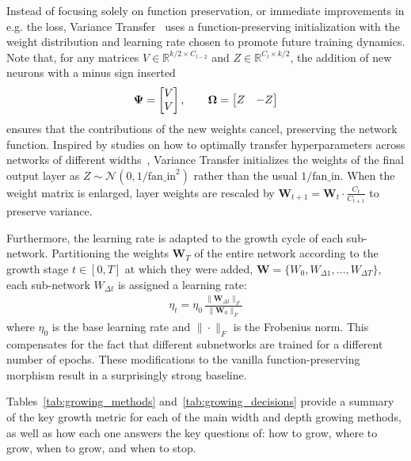 Instead of focusing solely on function preservation, or immediate improvements in e.g. the loss, Variance Transfer~\citep{yuan_accelerated_2023} uses a function-preserving initialization with the weight distribution and learning rate chosen to promote future training dynamics. Note that, for any matrices $V \in \mathbb{R}^{k/2\times C_{l-2}}$ and $Z \in \mathbb{R}^{C_l \times k/2}$, the addition of new neurons with a minus sign inserted
\begin{align}
    \boldsymbol{\Psi} = \begin{bmatrix} V \\ V \end{bmatrix}, \qquad
    \boldsymbol{\Omega} = \begin{bmatrix} Z & -Z \end{bmatrix}
\end{align}
ensures that the contributions of the new weights cancel, preserving the network function. Inspired by studies on how to optimally transfer hyperparameters across networks of different widths~\citep{yang_tensor_2021}, Variance Transfer initializes the weights of the final output layer as $Z \sim \mathcal{N}(0, 1/\textrm{fan\_in}^2)$ rather than the usual $1/\textrm{fan\_in}$. When the weight matrix is enlarged, layer weights are rescaled by $\boldsymbol{W}_{t+1}=\boldsymbol{W}_t \cdot \frac{C_t}{C_{t+1}}$ to preserve variance.

Furthermore, the learning rate is adapted to the growth cycle of each sub-network. Partitioning the weights $\mathbf{W}_T$ of the entire network according to the growth stage $t \in [0, T]$ at which they were added, $\mathbf{W} = \{W_0, W_{\Delta 1}, \ldots, W_{\Delta T} \}$, each sub-network $W_{\Delta t}$ is assigned a learning rate:
\begin{align}
\eta_t = \eta_0 \, \frac{\|\boldsymbol{W}_{\Delta t}\|_F}{\|\boldsymbol{W}_{0}\|_F}
\end{align}
where $\eta_0$ is the base learning rate and $\|\cdot\|_F$ is the Frobenius norm. This compensates for the fact that different subnetworks are trained for a different number of epochs. These modifications to the vanilla function-preserving morphism result in a surprisingly strong baseline.

Tables~\ref{tab:growing_methods} and~\ref{tab:growing_decisions} provide a summary of the key growth metric for each of the main width and depth growing methods, as well as how each one answers the key questions of: how to grow, where to grow, when to grow, and when to stop.

